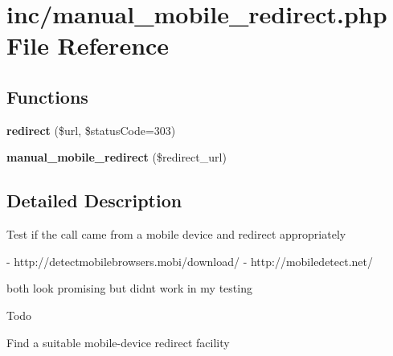 \section{inc/manual\+\_\+mobile\+\_\+redirect.php File Reference}
\label{manual__mobile__redirect_8php}
\subsection*{Functions}
\begin{DoxyCompactItemize}
\item 
{\bfseries redirect} (\$url, \$status\+Code=303)\label{manual__mobile__redirect_8php_aa2936f1606c56b05f4e715c8b9a54f39}

\item 
{\bfseries manual\+\_\+mobile\+\_\+redirect} (\$redirect\+\_\+url)\label{manual__mobile__redirect_8php_a47f14cabfee7515f9422ae068e599cca}

\end{DoxyCompactItemize}


\subsection{Detailed Description}
Test if the call came from a mobile device and redirect appropriately \begin{DoxyVerb}- http://detectmobilebrowsers.mobi/download/
- http://mobiledetect.net/
\end{DoxyVerb}
 both look promising but didn\textquotesingle{}t work in my testing

\begin{DoxyRefDesc}{Todo}
\item[{\bf Todo}]Find a suitable mobile-\/device redirect facility \end{DoxyRefDesc}
